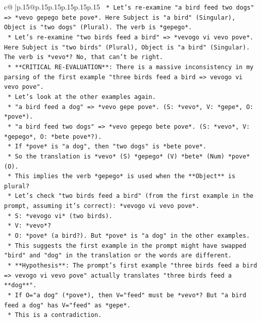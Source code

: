 \documentclass{article}
\begin{document}
{\begin{supertabular}{c@{$\;$}|p{.15\linewidth}@{}p{.15\linewidth}p{.15\linewidth}p{.15\linewidth}p{.15\linewidth}p{.15\linewidth}}
{{{\texttt{        *   Let's re{-}examine "a bird feed two dogs" => *vevo gepego bete pove*. Here Subject is "a bird" (Singular), Object is "two dogs" (Plural). The verb is *gepego*.} \\
\texttt{        *   Let's re{-}examine "two birds feed a bird" => *vevogo vi vevo pove*. Here Subject is "two birds" (Plural), Object is "a bird" (Singular). The verb is *vevo*? No, that can't be right.} \\
\texttt{        *   **CRITICAL RE{-}EVALUATION**: There is a massive inconsistency in my parsing of the first example "three birds feed a bird => vevogo vi vevo pove".} \\
\texttt{        *   Let's look at the other examples again.} \\
\texttt{        *   "a bird feed a dog" => *vevo gepe pove*. (S: *vevo*, V: *gepe*, O: *pove*).} \\
\texttt{        *   "a bird feed two dogs" => *vevo gepego bete pove*. (S: *vevo*, V: *gepego*, O: *bete pove*?).} \\
\texttt{            *   If *pove* is "a dog", then "two dogs" is *bete pove*.} \\
\texttt{            *   So the translation is *vevo* (S) *gepego* (V) *bete* (Num) *pove* (O).} \\
\texttt{            *   This implies the verb *gepego* is used when the **Object** is plural?} \\
\texttt{        *   Let's check "two birds feed a bird" (from the first example in the prompt, assuming it's correct): *vevogo vi vevo pove*.} \\
\texttt{            *   S: *vevogo vi* (two birds).} \\
\texttt{            *   V: *vevo*?} \\
\texttt{            *   O: *pove* (a bird?). But *pove* is "a dog" in the other examples.} \\
\texttt{            *   This suggests the first example in the prompt might have swapped "bird" and "dog" in the translation or the words are different.} \\
\texttt{            *   **Hypothesis**: The prompt's first example "three birds feed a bird => vevogo vi vevo pove" actually translates "three birds feed a **dog**".} \\
\texttt{                *   If O="a dog" (*pove*), then V="feed" must be *vevo*? But "a bird feed a dog" has V="feed" as *gepe*.} \\
\texttt{                *   This is a contradiction.} \\
}}}
\end{supertabular}}
\end{document}

